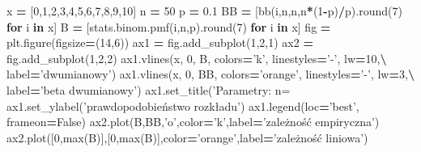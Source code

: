 \documentclass[polish,]{book}
\newenvironment{Shaded}{\begin{snugshade}}{\end{snugshade}}
\newcommand{\BuiltInTok}[1]{#1}
\newcommand{\ControlFlowTok}[1]{\textcolor[rgb]{0.13,0.29,0.53}{\textbf{#1}}}
\newcommand{\DecValTok}[1]{\textcolor[rgb]{0.00,0.00,0.81}{#1}}
\newcommand{\FloatTok}[1]{\textcolor[rgb]{0.00,0.00,0.81}{#1}}
\newcommand{\KeywordTok}[1]{\textcolor[rgb]{0.13,0.29,0.53}{\textbf{#1}}}
\newcommand{\NormalTok}[1]{#1}
\newcommand{\OperatorTok}[1]{\textcolor[rgb]{0.81,0.36,0.00}{\textbf{#1}}}
\newcommand{\SpecialCharTok}[1]{\textcolor[rgb]{0.00,0.00,0.00}{#1}}
\newcommand{\StringTok}[1]{\textcolor[rgb]{0.31,0.60,0.02}{#1}}
\newcommand{\VariableTok}[1]{\textcolor[rgb]{0.00,0.00,0.00}{#1}}
\begin{document}
\begin{Shaded}
\begin{Highlighting}[]
\NormalTok{x }\OperatorTok{=}\NormalTok{ [}\DecValTok{0}\NormalTok{,}\DecValTok{1}\NormalTok{,}\DecValTok{2}\NormalTok{,}\DecValTok{3}\NormalTok{,}\DecValTok{4}\NormalTok{,}\DecValTok{5}\NormalTok{,}\DecValTok{6}\NormalTok{,}\DecValTok{7}\NormalTok{,}\DecValTok{8}\NormalTok{,}\DecValTok{9}\NormalTok{,}\DecValTok{10}\NormalTok{]}
\NormalTok{n }\OperatorTok{=} \DecValTok{50}
\NormalTok{p }\OperatorTok{=} \FloatTok{0.1}
\NormalTok{BB }\OperatorTok{=}\NormalTok{ [bb(i,n,n,n}\OperatorTok{*}\NormalTok{(}\DecValTok{1}\OperatorTok{-}\NormalTok{p)}\OperatorTok{/}\NormalTok{p).}\BuiltInTok{round}\NormalTok{(}\DecValTok{7}\NormalTok{) }\ControlFlowTok{for}\NormalTok{ i }\KeywordTok{in}\NormalTok{ x]}
\NormalTok{B  }\OperatorTok{=}\NormalTok{ [stats.binom.pmf(i,n,p).}\BuiltInTok{round}\NormalTok{(}\DecValTok{7}\NormalTok{) }\ControlFlowTok{for}\NormalTok{ i }\KeywordTok{in}\NormalTok{ x]}
\NormalTok{fig }\OperatorTok{=}\NormalTok{ plt.figure(figsize}\OperatorTok{=}\NormalTok{(}\DecValTok{14}\NormalTok{,}\DecValTok{6}\NormalTok{))}
\NormalTok{ax1 }\OperatorTok{=}\NormalTok{ fig.add_subplot(}\DecValTok{1}\NormalTok{,}\DecValTok{2}\NormalTok{,}\DecValTok{1}\NormalTok{)}
\NormalTok{ax2 }\OperatorTok{=}\NormalTok{ fig.add_subplot(}\DecValTok{1}\NormalTok{,}\DecValTok{2}\NormalTok{,}\DecValTok{2}\NormalTok{)}
\NormalTok{ax1.vlines(x, }\DecValTok{0}\NormalTok{, B, colors}\OperatorTok{=}\StringTok{'k'}\NormalTok{, linestyles}\OperatorTok{=}\StringTok{'-'}\NormalTok{, lw}\OperatorTok{=}\DecValTok{10}\NormalTok{,}\OperatorTok{\textbackslash{}}
\NormalTok{           label}\OperatorTok{=}\StringTok{'dwumianowy'}\NormalTok{)   }
\NormalTok{ax1.vlines(x, }\DecValTok{0}\NormalTok{, BB, colors}\OperatorTok{=}\StringTok{'orange'}\NormalTok{, linestyles}\OperatorTok{=}\StringTok{'-'}\NormalTok{, lw}\OperatorTok{=}\DecValTok{3}\NormalTok{,}\OperatorTok{\textbackslash{}}
\NormalTok{           label}\OperatorTok{=}\StringTok{'beta dwumianowy'}\NormalTok{)}
\NormalTok{ax1.set_title(}\StringTok{'Parametry: n=%
\NormalTok{ax1.set_ylabel(}\StringTok{'prawdopodobieństwo rozkładu'}\NormalTok{)}
\NormalTok{ax1.legend(loc}\OperatorTok{=}\StringTok{'best'}\NormalTok{, frameon}\OperatorTok{=}\VariableTok{False}\NormalTok{) }
\NormalTok{ax2.plot(B,BB,}\StringTok{'o'}\NormalTok{,color}\OperatorTok{=}\StringTok{'k'}\NormalTok{,label}\OperatorTok{=}\StringTok{'zależność empiryczna'}\NormalTok{)}
\NormalTok{ax2.plot([}\DecValTok{0}\NormalTok{,}\BuiltInTok{max}\NormalTok{(B)],[}\DecValTok{0}\NormalTok{,}\BuiltInTok{max}\NormalTok{(B)],color}\OperatorTok{=}\StringTok{'orange'}\NormalTok{,label}\OperatorTok{=}\StringTok{'zależność liniowa'}\NormalTok{)}
}
\end{Highlighting}
\end{Shaded}
\end{document}
